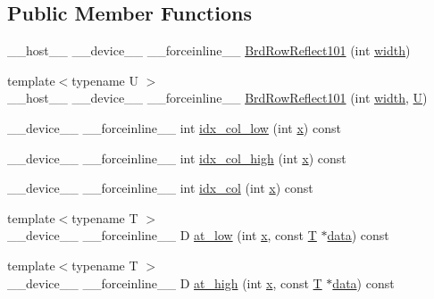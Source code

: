 \subsection*{Public Member Functions}
\begin{DoxyCompactItemize}
\item 
\-\_\-\-\_\-host\-\_\-\-\_\- \-\_\-\-\_\-device\-\_\-\-\_\- \-\_\-\-\_\-forceinline\-\_\-\-\_\- \hyperlink{structcv_1_1gpu_1_1device_1_1BrdRowReflect101_a58acfa27b16f65719a95c3c2a1cc3b8f}{Brd\-Row\-Reflect101} (int \hyperlink{highgui__c_8h_a2474a5474cbff19523a51eb1de01cda4}{width})
\item 
{\footnotesize template$<$typename U $>$ }\\\-\_\-\-\_\-host\-\_\-\-\_\- \-\_\-\-\_\-device\-\_\-\-\_\- \-\_\-\-\_\-forceinline\-\_\-\-\_\- \hyperlink{structcv_1_1gpu_1_1device_1_1BrdRowReflect101_a71a04eba391e42bf862c12ece3828172}{Brd\-Row\-Reflect101} (int \hyperlink{highgui__c_8h_a2474a5474cbff19523a51eb1de01cda4}{width}, \hyperlink{core__c_8h_aa9c521f41af9a5191e5e4b6ffbae211a}{U})
\item 
\-\_\-\-\_\-device\-\_\-\-\_\- \-\_\-\-\_\-forceinline\-\_\-\-\_\- int \hyperlink{structcv_1_1gpu_1_1device_1_1BrdRowReflect101_a86481c93bede3629d1ccb9e154d942ed}{idx\-\_\-col\-\_\-low} (int \hyperlink{highgui__c_8h_a6150e0515f7202e2fb518f7206ed97dc}{x}) const 
\item 
\-\_\-\-\_\-device\-\_\-\-\_\- \-\_\-\-\_\-forceinline\-\_\-\-\_\- int \hyperlink{structcv_1_1gpu_1_1device_1_1BrdRowReflect101_a2a08e4c3270ceb05ee1028b3dca581b1}{idx\-\_\-col\-\_\-high} (int \hyperlink{highgui__c_8h_a6150e0515f7202e2fb518f7206ed97dc}{x}) const 
\item 
\-\_\-\-\_\-device\-\_\-\-\_\- \-\_\-\-\_\-forceinline\-\_\-\-\_\- int \hyperlink{structcv_1_1gpu_1_1device_1_1BrdRowReflect101_a072a689e32bd9b43ded37ac3de282808}{idx\-\_\-col} (int \hyperlink{highgui__c_8h_a6150e0515f7202e2fb518f7206ed97dc}{x}) const 
\item 
{\footnotesize template$<$typename T $>$ }\\\-\_\-\-\_\-device\-\_\-\-\_\- \-\_\-\-\_\-forceinline\-\_\-\-\_\- D \hyperlink{structcv_1_1gpu_1_1device_1_1BrdRowReflect101_a8c7472a00c779e8038de277da646e8f5}{at\-\_\-low} (int \hyperlink{highgui__c_8h_a6150e0515f7202e2fb518f7206ed97dc}{x}, const \hyperlink{calib3d_8hpp_a3efb9551a871ddd0463079a808916717}{T} $\ast$\hyperlink{legacy_8hpp_ab9fe6c09e6d02865a953fffc12fe6ca0}{data}) const 
\item 
{\footnotesize template$<$typename T $>$ }\\\-\_\-\-\_\-device\-\_\-\-\_\- \-\_\-\-\_\-forceinline\-\_\-\-\_\- D \hyperlink{structcv_1_1gpu_1_1device_1_1BrdRowReflect101_a65d1f09c86d50077a93e1602d2c7faa6}{at\-\_\-high} (int \hyperlink{highgui__c_8h_a6150e0515f7202e2fb518f7206ed97dc}{x}, const \hyperlink{calib3d_8hpp_a3efb9551a871ddd0463079a808916717}{T} $\ast$\hyperlink{legacy_8hpp_ab9fe6c09e6d02865a953fffc12fe6ca0}{data}) const 

\end{DoxyCompactItemize}
